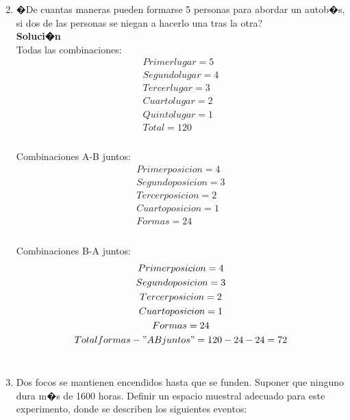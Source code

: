 \documentclass{article}
\begin{document}
	
    \begin{enumerate}
	\setcounter{enumi}{1} 
    \item �De cuantas maneras pueden formarse 5 personas para abordar un autob�s, si dos de las personas se niegan a hacerlo una tras la otra?
    \\\textbf{Soluci�n}\\Todas las combinaciones:
    \begin{gather*}    	
    	Primer lugar  = 5\\
    	Segundo lugar = 4\\
    	Tercer lugar  = 3\\
    	Cuarto lugar  = 2\\
    	Quinto lugar  = 1\\
    	Total         = 120\\
    \end{gather*}\\Combinaciones A-B juntos:\\
    \begin{gather*}    	
    	Primer posicion  = 4\\
    	Segundo posicion = 3\\
    	Tercer posicion  = 2\\
    	Cuarto posicion  = 1\\
    	Formas           = 24\\
    \end{gather*}\\Combinaciones B-A juntos:\\
    \begin{gather*}    	
    	Primer posicion  = 4\\
    	Segundo posicion = 3\\
    	Tercer posicion  = 2\\
    	Cuarto posicion  = 1\\
    	Formas           = 24\\
    	Total formas - "A B juntos" = 120 -24 - 24 = 72\\        
    \end{gather*}\\
    
	\item Dos focos se mantienen encendidos hasta que se funden. Suponer que ninguno dura m�s de 1600 		horas. Definir un espacio muestral adecuado para este experimento, donde se describen los siguientes eventos:\\
	

\end{enumerate}
\end{document}

